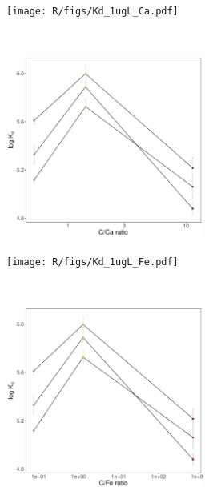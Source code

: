 \begin{figure}[t!]
    \centering
    \begin{subfigure}[t]{0.5\textwidth}
        \centering
        \texttt{[image: R/figs/Kd\_1ugL\_Ca.pdf]}
        \caption{}
        \label{subfig:Ca}
    \end{subfigure}%
    ~ 
    \begin{subfigure}[t]{0.5\textwidth}
        \centering
        \includegraphics[height=6cm]{R/figs/Kd_1ugL_C_Ca.pdf}
        \caption{}
        \label{subfig:C_Ca}
    \end{subfigure}
    \medskip
    \begin{subfigure}[t]{0.5\textwidth}
        \centering
        \texttt{[image: R/figs/Kd\_1ugL\_Fe.pdf]}
        \caption{}
        \label{subfig:Fe}
    \end{subfigure}%
    ~ 
    \begin{subfigure}[t]{0.5\textwidth}
        \centering
        \includegraphics[height=6cm]{R/figs/Kd_1ugL_C_Fe.pdf}
        \caption{}
        \label{subfig:C_Fe}
    \end{subfigure}
    \label{fig:C_Ca_Fe}
    \caption{}
\end{figure}

